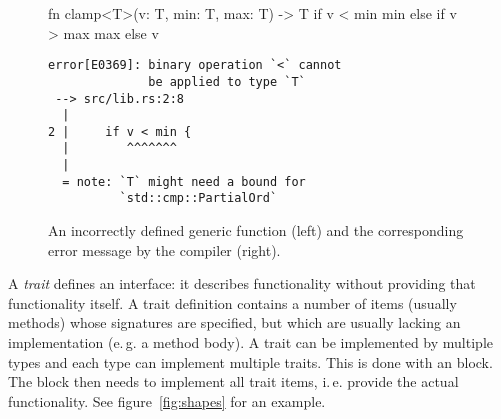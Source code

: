 \begin{figure}[h]
  \centering
  \begin{minipage}[t]{.55\textwidth}
    \begin{rustcode}
      fn clamp<T>(v: T, min: T, max: T) -> T {
          if v < min {
              min
          } else if v > max {
              max
          } else {
              v
          }
      }
    \end{rustcode}
  \end{minipage}
  \hspace{2mm}
  \begin{minipage}[t]{.42\textwidth}
    \footnotesize
    \vspace{3mm}
    \begin{verbatim}
error[E0369]: binary operation `<` cannot
              be applied to type `T`
 --> src/lib.rs:2:8
  |
2 |     if v < min {
  |        ^^^^^^^
  |
  = note: `T` might need a bound for
          `std::cmp::PartialOrd`
    \end{verbatim}
  \end{minipage}
  \caption{
    An incorrectly defined generic function (left) and the corresponding error message by the compiler (right).
  }
  \label{fig:clamp}
\end{figure}

A \emph{trait} defines an interface: it describes functionality without providing that functionality itself.
A trait definition contains a number of items (usually methods) whose signatures are specified, but which are usually lacking an implementation (e.\,g. a method body).
A trait can be implemented by multiple types and each type can implement multiple traits.
This is done with an  block.
The  block then needs to implement all trait items, i.\,e. provide the actual functionality.
See figure~\ref{fig:shapes} for an example.




